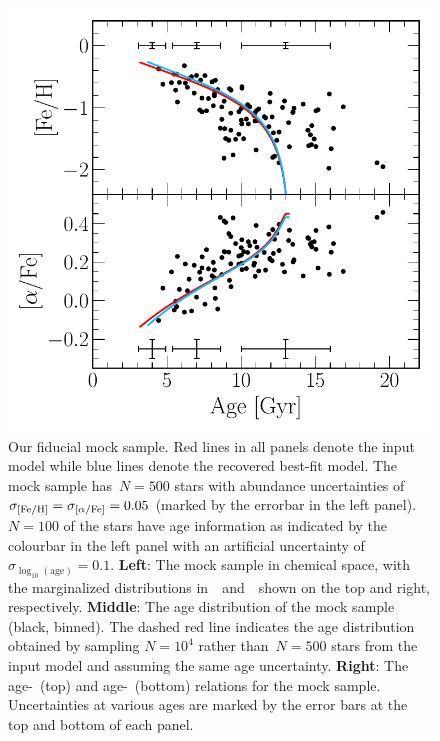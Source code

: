 \documentclass[foo.tex]{subfiles}
\begin{document}
\begin{figure}
\includegraphics[scale = 0.41]{fiducial_mock_amr.pdf}
\caption{
Our fiducial mock sample.
Red lines in all panels denote the input model while blue lines denote the
recovered best-fit model.
The mock sample has~$N = 500$ stars with abundance uncertainties of
$\sigma_{\text{[Fe/H]}} = \sigma_{\text{[$\alpha$/Fe]}} = 0.05$ (marked by the errorbar in the left panel).
$N = 100$ of the stars have age information as indicated by the colourbar in
the left panel with an artificial uncertainty
of~$\sigma_{\log_{10}(\text{age})} = 0.1$.
\textbf{Left}: The mock sample in chemical space, with the marginalized
distributions in~\feh~and~\afe~shown on the top and right, respectively.
\textbf{Middle}: The age distribution of the mock sample (black, binned).
The dashed red line indicates the age distribution obtained by sampling
$N = 10^4$ rather than~$N = 500$ stars from the input model and assuming the
same age uncertainty.
\textbf{Right}: The age-\feh~(top) and age-\afe~(bottom) relations for the mock
sample.
Uncertainties at various ages are marked by the error bars at the top and
bottom of each panel.
}
\label{fig:fiducial_mock}
\end{figure}
\end{document}
